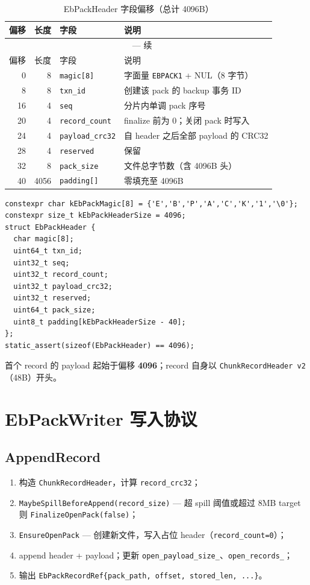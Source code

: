 \begin{longtable}{@{}rrlp{5.5cm}@{}}
\caption{EbPackHeader 字段偏移（总计 4096B）} \\
\toprule
偏移 & 长度 & 字段 & 说明 \\
\midrule
\endfirsthead
\multicolumn{4}{c}{\tablename\ \thetable{} — 续} \\
\toprule
偏移 & 长度 & 字段 & 说明 \\
\midrule
\endhead
0 & 8 & \texttt{magic[8]} & 字面量 \texttt{EBPACK1} + NUL（8 字节） \\
8 & 8 & \texttt{txn\_id} & 创建该 pack 的 backup 事务 ID \\
16 & 4 & \texttt{seq} & 分片内单调 pack 序号 \\
20 & 4 & \texttt{record\_count} & finalize 前为 0；关闭 pack 时写入 \\
24 & 4 & \texttt{payload\_crc32} & 自 header 之后全部 payload 的 CRC32 \\
28 & 4 & \texttt{reserved} & 保留 \\
32 & 8 & \texttt{pack\_size} & 文件总字节数（含 4096B 头） \\
40 & 4056 & \texttt{padding[]} & 零填充至 4096B \\
\bottomrule
\end{longtable}

\begin{lstlisting}[caption={EbPackHeader（\filepath{eb\_pack.h}）},label={lst:ebpack-header-full}]
constexpr char kEbPackMagic[8] = {'E','B','P','A','C','K','1','\0'};
constexpr size_t kEbPackHeaderSize = 4096;
struct EbPackHeader {
  char magic[8];
  uint64_t txn_id;
  uint32_t seq;
  uint32_t record_count;
  uint32_t payload_crc32;
  uint32_t reserved;
  uint64_t pack_size;
  uint8_t padding[kEbPackHeaderSize - 40];
};
static_assert(sizeof(EbPackHeader) == 4096);
\end{lstlisting}

首个 record 的 payload 起始于偏移 \textbf{4096}；record 自身以 \texttt{ChunkRecordHeader v2}（48B）开头。

\section{EbPackWriter 写入协议}

\subsection{AppendRecord}

\begin{enumerate}
  \item 构造 \texttt{ChunkRecordHeader}，计算 \texttt{record\_crc32}；
  \item \texttt{MaybeSpillBeforeAppend(record\_size)} — 超 spill 阈值或超过 8MB target 则 \texttt{FinalizeOpenPack(false)}；
  \item \texttt{EnsureOpenPack} — 创建新文件，写入占位 header（\texttt{record\_count=0}）；
  \item append header + payload；更新 \texttt{open\_payload\_size\_}、\texttt{open\_records\_}；
  \item 输出 \texttt{EbPackRecordRef\{pack\_path, offset, stored\_len, ...\}}。
\end{enumerate}

